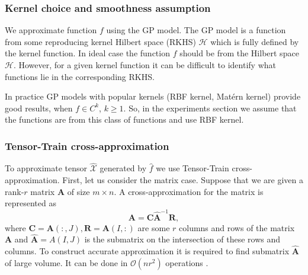 
\subsubsection{Kernel choice and smoothness assumption}
We approximate function $f$ using the GP model.
The GP model is a function from some reproducing kernel Hilbert space (RKHS) $\mathcal{H}$ which is fully defined by the kernel function.
In ideal case the function $f$ should be from the Hilbert space $\mathcal{H}$.
However, for a given kernel function it can be difficult to identify what functions lie in the corresponding RKHS.

In practice GP models with popular kernels (RBF kernel, Mat{\'{e}}rn kernel) provide good results, when $f \in C^k$, $k \ge 1$.
So, in the experiments section we assume that the functions are from this class of functions and use RBF kernel.

\subsubsection{Tensor-Train cross-approximation}
\label{sec:tt_cross}
To approximate tensor $\widehat{\mathcal{X}}$ generated by $\hat{f}$ we use Tensor-Train cross-approximation.
First, let us consider the matrix case.
Suppose that we are given a rank-$r$ matrix $\mathbf{A}$ of size $m \times n$.
A cross-approxi\-mation for the matrix is represented as
\[
    \mathbf{A} = \mathbf{C} \widehat{\mathbf{A}}^{-1} \mathbf{R},
\]
where $\mathbf{C} = \mathbf{A}(:, J), \mathbf{R} = \mathbf{A}(I, :)$ are some $r$ columns and rows of the matrix $\mathbf{A}$ and $\widehat{\mathbf{A}} = A(I, J)$ is the submatrix on the intersection of these rows and columns. To construct accurate approximation it is required to find submatrix $\widehat{\mathbf{A}}$ of large volume.
It can be done in $\mathcal{O}(nr^2)$ operations \citep{tyrtyshnikov2000incomplete}.

